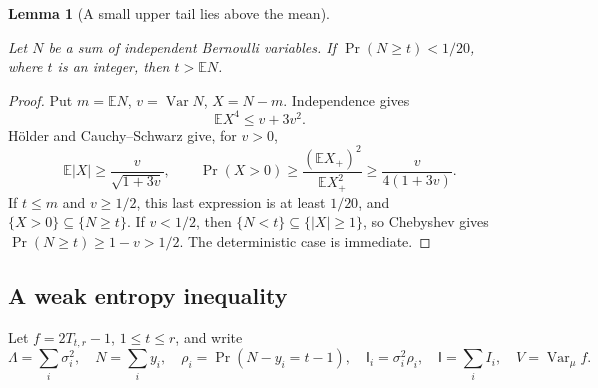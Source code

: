\documentclass[11pt]{amsart}
\newtheorem{lemma}[theorem]{Lemma}
\theoremstyle{definition}
\theoremstyle{remark}
\newcommand{\I}{\mathsf I}
\begin{document}
\begin{lemma}[A small upper tail lies above the mean]\label{bias:tail-above-mean}

Let \(N\) be a sum of independent Bernoulli variables. If \(\Pr(N\ge t)<1/20\), where \(t\) is an integer, then \(t>\mathbb EN\).

\end{lemma}
\begin{proof}

Put \(m=\mathbb EN\), \(v=\operatorname{Var}N\), \(X=N-m\). Independence gives \[
 \mathbb EX^4\le v+3v^2.
\] Hölder and Cauchy--Schwarz give, for \(v>0\), \[
 \mathbb E|X|\ge\frac{v}{\sqrt{1+3v}},\qquad
 \Pr(X>0)\ge
 \frac{(\mathbb EX_+)^2}{\mathbb EX_+^2}
 \ge\frac{v}{4(1+3v)}.
\] If \(t\le m\) and \(v\ge1/2\), this last expression is at least \(1/20\), and \(\{X>0\}\subseteq\{N\ge t\}\). If \(v<1/2\), then \(\{N<t\}\subseteq\{|X|\ge1\}\), so Chebyshev gives \(\Pr(N\ge t)\ge1-v>1/2\). The deterministic case is immediate.

\end{proof}

\subsection{A weak entropy inequality}\label{bias:weak-section}

Let \(f=2T_{t,r}-1\), \(1\le t\le r\), and write \[
 \Lambda=\sum_i\sigma_i^2,\quad
 N=\sum_i y_i,\quad
 \rho_i=\Pr(N-y_i=t-1),\quad \I_i=\sigma_i^2\rho_i,
 \quad \I=\sum_iI_i,\quad V=\operatorname{Var}_\mu f.
\]
\end{document}
